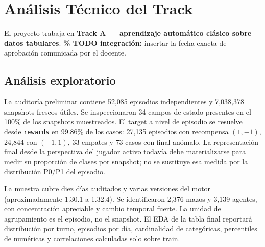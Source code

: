 \section{Análisis Técnico del Track}
\label{sec:analisistecnico}

El proyecto trabaja en \textbf{Track A --- aprendizaje automático
clásico sobre datos tabulares}. \textbf{\% TODO integración:} insertar
la fecha exacta de aprobación comunicada por el docente.

\subsection{Análisis exploratorio}
\label{subsec:eda}
La auditoría preliminar contiene 52,085 episodios independientes y
7,038,378 snapshots frescos útiles. Se inspeccionaron 34 campos de
estado presentes en el 100\% de los snapshots muestreados. El target a
nivel de episodio se resuelve desde \texttt{rewards} en 99.86\% de los
casos: 27,135 episodios con recompensa $(1,-1)$, 24,844 con $(-1,1)$,
33 empates y 73 casos con final anómalo. La representación final desde
la perspectiva del jugador activo todavía debe materializarse para
medir su proporción de clases por snapshot; no se sustituye esa medida
por la distribución P0/P1 del episodio.

La muestra cubre diez días auditados y varias versiones del motor
(aproximadamente 1.30.1 a 1.32.4). Se identificaron 2,376 mazos y 3,139
agentes, con concentración apreciable y cambio temporal fuerte. La
unidad de agrupamiento es el episodio, no el snapshot. El EDA de la
tabla final reportará distribución por turno, episodios por día,
cardinalidad de categóricas, percentiles de numéricas y correlaciones
calculadas solo sobre train.

